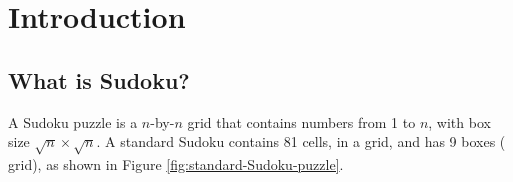 \documentclass[12pt,a4paper]{article}
\begin{document}
\restoregeometry


\newpage %
{\hypersetup{linkcolor=black}
\begin{spacing}{2.0}
    \clearpage
    \tableofcontents
    \thispagestyle{empty}
    \setcounter{page}{0}
\end{spacing}
}


\newpage %
\section{Introduction}

	\subsection{What is Sudoku?}
	A Sudoku puzzle is a $n$-by-$n$ grid that contains numbers from \num{1} to $n$, with box size $\sqrt{n} \times \sqrt{n}$.
	A standard Sudoku contains \num{81} cells, in a  grid, and has \num{9} boxes ( grid),
	as shown in Figure \ref{fig:standard-Sudoku-puzzle}.
\end{document}
